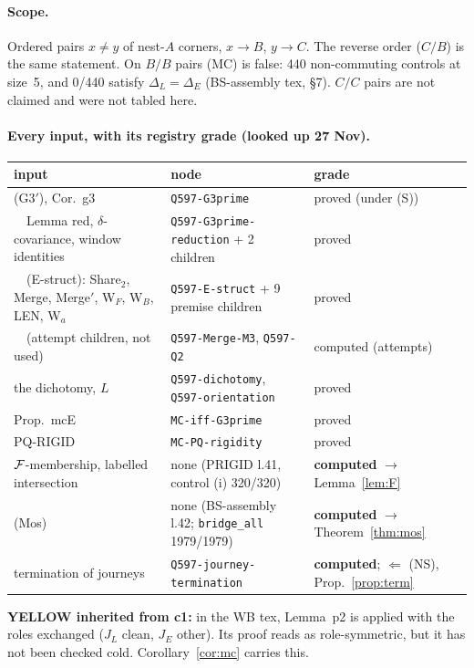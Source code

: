 \documentclass[11pt]{article}
\theoremstyle{definition}\newtheorem{definition}[theorem]{Definition}\newtheorem{remark}[theorem]{Remark}
\begin{document}
\paragraph{Scope.} Ordered pairs $x\ne y$ of nest-$A$ corners, $x\to B$, $y\to C$. The reverse order ($C/B$) is the same statement. On $B/B$ pairs (MC) is false: 440 non-commuting controls at size~5, and 0/440 satisfy $\Delta_L=\Delta_E$ (BS-assembly tex, \S7). $C/C$ pairs are not claimed and were not tabled here.

\paragraph{Every input, with its registry grade (looked up 27 Nov).}
\begin{center}\small\begin{tabular}{lll}\toprule
input & node & grade\\\midrule
(G$3'$), Cor.~g3 & \texttt{Q597-G3prime} & proved (under (S))\\
\ \ Lemma red, $\delta$-covariance, window identities & \texttt{Q597-G3prime-reduction} + 2 children & proved\\
\ \ (E-struct): Share$_2$, Merge, Merge$'$, W$_F$, W$_B$, LEN, W$_a$ & \texttt{Q597-E-struct} + 9 premise children & proved\\
\ \ (attempt children, not used) & \texttt{Q597-Merge-M3}, \texttt{Q597-Q2} & computed (attempts)\\
the dichotomy, $L$ & \texttt{Q597-dichotomy}, \texttt{Q597-orientation} & proved\\
Prop.~mcE & \texttt{MC-iff-G3prime} & proved\\
PQ-RIGID & \texttt{MC-PQ-rigidity} & proved\\
$\mathcal F$-membership, labelled intersection & none (PRIGID l.41, control (i) 320/320) & \textbf{computed} $\to$ Lemma~\ref{lem:F}\\
(Mos) & none (BS-assembly l.42; \texttt{bridge\_all} 1979/1979) & \textbf{computed} $\to$ Theorem~\ref{thm:mos}\\
termination of journeys & \texttt{Q597-journey-termination} & \textbf{computed}; $\Leftarrow$ (NS), Prop.~\ref{prop:term}\\\bottomrule
\end{tabular}\end{center}
\textbf{YELLOW inherited from c1:} in the WB tex, Lemma~p2 is applied with the roles exchanged ($J_L$ clean, $J_E$ other). Its proof reads as role-symmetric, but it has not been checked cold. Corollary~\ref{cor:mc} carries this.
\end{document}
